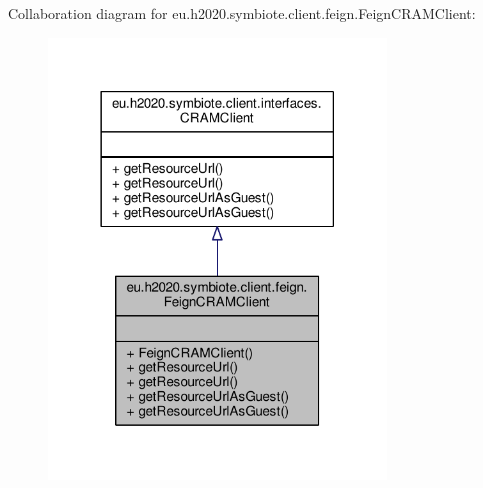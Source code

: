 Collaboration diagram for eu.\+h2020.\+symbiote.\+client.\+feign.\+Feign\+C\+R\+A\+M\+Client\+:\nopagebreak
\begin{figure}[H]
\begin{center}
\leavevmode
\includegraphics[width=254pt]{classeu_1_1h2020_1_1symbiote_1_1client_1_1feign_1_1FeignCRAMClient__coll__graph}
\end{center}
\end{figure}
